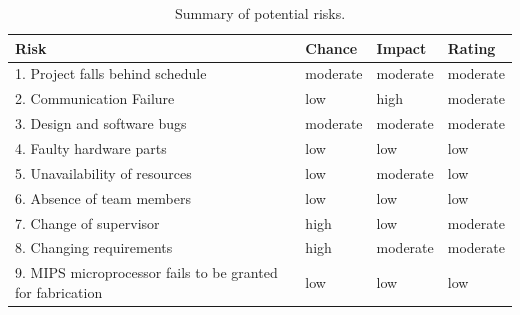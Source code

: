 \documentclass[a4paper,12pt]{article}
\begin{document}
\begin{table}[h]
\begin{tabular}{|l|l|l|l|}
  \hline
  \textbf{Risk} & \textbf{Chance} & \textbf{Impact} & \textbf{Rating} \\
  \hline
  \hline
  1. Project falls behind schedule & moderate & moderate & moderate\\
  \hline
  2. Communication Failure & low & high & moderate\\
  \hline
  3. Design and software bugs & moderate & moderate & moderate\\
  \hline
  4. Faulty hardware parts & low & low & low\\
  \hline
  5. Unavailability of resources & low & moderate & low\\
  \hline
  6. Absence of team members & low & low &low\\
  \hline
  7. Change of supervisor & high & low & moderate\\
  \hline
  8. Changing requirements & high & moderate & moderate\\
  \hline
  9. MIPS microprocessor fails to be granted for fabrication & low &
  low & low\\
  \hline
\end{tabular}
\caption{Summary of potential risks.}
  \label{risks}
\end{table}
\end{document}
